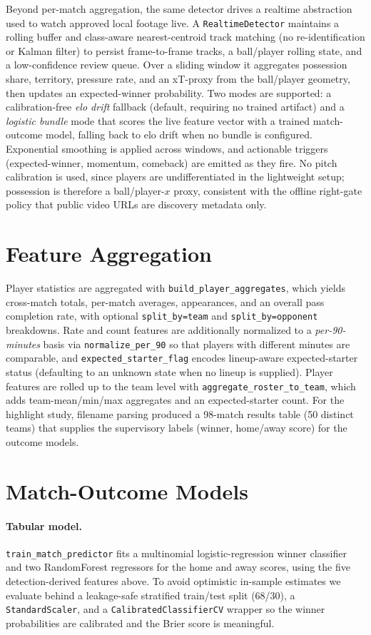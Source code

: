 \documentclass[11pt]{article}
\begin{document}
Beyond per-match aggregation, the same detector drives a realtime abstraction
used to watch approved local footage live. A \texttt{RealtimeDetector} maintains
a rolling buffer and class-aware nearest-centroid track matching (no
re-identification or Kalman filter) to persist frame-to-frame tracks, a
ball/player rolling state, and a low-confidence review queue. Over a sliding
window it aggregates possession share, territory, pressure rate, and an
xT-proxy from the ball/player geometry, then updates an expected-winner
probability. Two modes are supported: a calibration-free \emph{elo drift} fallback
(default, requiring no trained artifact) and a \emph{logistic bundle} mode that
scores the live feature vector with a trained match-outcome model, falling back
to elo drift when no bundle is configured. Exponential smoothing is applied
across windows, and actionable triggers (expected-winner, momentum, comeback)
are emitted as they fire. No pitch calibration is used, since players are
undifferentiated in the lightweight setup; possession is therefore a
ball/player-$x$ proxy, consistent with the offline right-gate policy that
public video URLs are discovery metadata only.

\section{Feature Aggregation}
Player statistics are aggregated with \texttt{build\_player\_aggregates}, which
yields cross-match totals, per-match averages, appearances, and an overall pass
completion rate, with optional \texttt{split\_by=team} and
\texttt{split\_by=opponent} breakdowns. Rate and count features are additionally
normalized to a \emph{per-90-minutes} basis via \texttt{normalize\_per\_90} so
that players with different minutes are comparable, and \texttt{expected\_starter\_flag}
encodes lineup-aware expected-starter status (defaulting to an unknown state when
no lineup is supplied). Player features are rolled up to the team level with
\texttt{aggregate\_roster\_to\_team}, which adds team-mean/min/max aggregates and
an expected-starter count. For the highlight study, filename parsing
produced a 98-match results table (50 distinct teams) that supplies the
supervisory labels (winner, home/away score) for the outcome models.

\section{Match-Outcome Models}
\paragraph{Tabular model.} \texttt{train\_match\_predictor} fits a multinomial
logistic-regression winner classifier and two RandomForest regressors for the
home and away scores, using the five detection-derived features above. To avoid
optimistic in-sample estimates we evaluate behind a leakage-safe stratified
train/test split (68/30), a \texttt{StandardScaler}, and a
\texttt{CalibratedClassifierCV} wrapper so the winner probabilities are
calibrated and the Brier score is meaningful.
\end{document}
